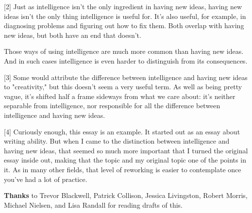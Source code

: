 [2] Just as intelligence isn't the only ingredient in having
                  new ideas, having new ideas isn't the only thing intelligence
                  is useful for. It's also useful, for example, in diagnosing
                  problems and figuring out how to fix them. Both overlap with
                  having new ideas, but both have an end that doesn't.

Those
                  ways of using intelligence are much more common than having
                  new ideas. And in such cases intelligence is even harder to
                  distinguish from its consequences.

[3] Some would attribute the difference between intelligence
                  and having new ideas to "creativity," but this doesn't seem a
                  very useful term. As well as being pretty vague, it's shifted
                  half a frame sideways from what we care about: it's neither
                  separable from intelligence, nor responsible for all the
                  difference between intelligence and having new ideas.

[4] Curiously enough, this essay is an example. It started out
                  as an essay about writing ability. But when I came to the
                  distinction between intelligence and having new ideas, that
                  seemed so much more important that I turned the original essay
                  inside out, making that the topic and my original topic one of
                  the points in it. As in many other fields, that level of
                  reworking is easier to contemplate once you've had a lot of
                  practice.




                    \textbf{Thanks} to Trevor Blackwell, Patrick Collison, Jessica
                    Livingston, Robert Morris, Michael Nielsen, and Lisa Randall
                    for reading drafts of this. 


              
            
          
            
              
                


                  
              
            
          
